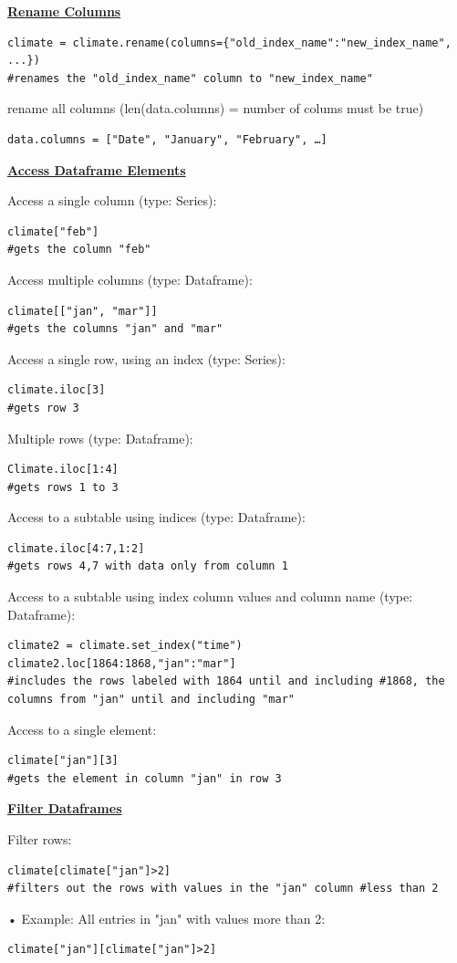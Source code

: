 {\centering\underline{\textbf{Rename Columns}} \par}
\begin{lstlisting}
climate = climate.rename(columns={"old_index_name":"new_index_name", ...})
#renames the "old_index_name" column to "new_index_name"
\end{lstlisting}
rename all columns (len(data.columns) = number of colums must be true)
\begin{lstlisting}data.columns = ["Date", "January", "February", …]\end{lstlisting}

{\centering\underline{\textbf{Access Dataframe Elements}} \par}
Access a single column (type: Series):
\begin{lstlisting}
climate["feb"]
#gets the column "feb"
\end{lstlisting}
Access multiple columns (type: Dataframe):
\begin{lstlisting}
climate[["jan", "mar"]]
#gets the columns "jan" and "mar"
\end{lstlisting}
Access a single row, using an index (type: Series):
\begin{lstlisting}
climate.iloc[3]
#gets row 3
\end{lstlisting}
Multiple rows (type: Dataframe):
\begin{lstlisting}
Climate.iloc[1:4]
#gets rows 1 to 3
\end{lstlisting}
Access to a subtable using indices (type: Dataframe):
\begin{lstlisting}
climate.iloc[4:7,1:2]
#gets rows 4,7 with data only from column 1
\end{lstlisting}
Access to a subtable using index column values and column name (type: Dataframe):
\begin{lstlisting}
climate2 = climate.set_index("time")
climate2.loc[1864:1868,"jan":"mar"]
#includes the rows labeled with 1864 until and including #1868, the columns from "jan" until and including "mar"
\end{lstlisting}
Access to a single element:
\begin{lstlisting}
climate["jan"][3]
#gets the element in column "jan" in row 3
\end{lstlisting}

{\centering\underline{\textbf{Filter Dataframes}} \par}
Filter rows:
\begin{lstlisting}
climate[climate["jan"]>2]
#filters out the rows with values in the "jan" column #less than 2
\end{lstlisting}
• Example: All entries in "jan" with values more than 2:
\begin{lstlisting}
climate["jan"][climate["jan"]>2]
\end{lstlisting}

